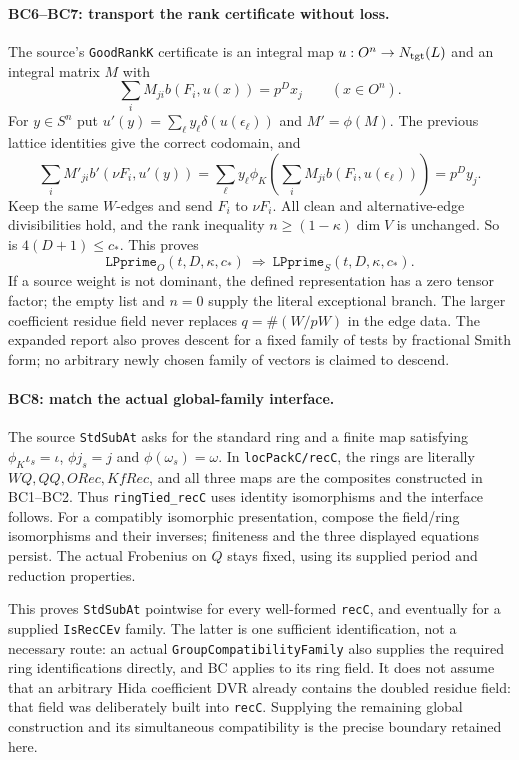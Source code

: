 \paragraph{BC6--BC7: transport the rank certificate without loss.}
The source's \texttt{GoodRankK} certificate is an integral map
$u:O^n\to N_{\rm tgt}(L)$ and an integral matrix $M$ with
\[
 \sum_i M_{ji}b(F_i,u(x))=p^Dx_j\qquad(x\in O^n).
\]
For $y\in S^n$ put $u'(y)=\sum_\ell y_\ell\delta(u(\epsilon_\ell))$
and $M'=\phi(M)$. The previous lattice identities give the correct
codomain, and
\[
 \sum_iM'_{ji}b'(\nu F_i,u'(y))
 =\sum_\ell y_\ell\phi_K\!\left(
         \sum_iM_{ji}b(F_i,u(\epsilon_\ell))\right)=p^Dy_j.
                                                               \tag{BC.11}
\]
Keep the same $W$-edges and send $F_i$ to $\nu F_i$. All clean
and alternative-edge divisibilities hold, and the rank inequality
$n\ge(1-\kappa)\dim V$ is unchanged. So is $4(D+1)\le c_*$.
This proves
\[
 \texttt{LPprime}_{O}(t,D,\kappa,c_*)
 \ \Longrightarrow\
 \texttt{LPprime}_{S}(t,D,\kappa,c_*).                    \tag{BC.12}
\]
If a source weight is not dominant, the defined representation has a
zero tensor factor; the empty list and $n=0$ supply the literal
exceptional branch. The larger coefficient residue field never replaces
$q=\#(W/pW)$ in the edge data. The expanded report also proves descent
for a fixed family of tests by fractional Smith form; no arbitrary newly
chosen family of vectors is claimed to descend.

\paragraph{BC8: match the actual global-family interface.}
The source \texttt{StdSubAt} asks for the standard ring and a finite map
satisfying $\phi_K\iota_s=\iota$, $\phi j_s=j$ and
$\phi(\omega_s)=\omega$. In \texttt{locPackC/recC}, the rings are
literally $WQ,QQ,ORec,KfRec$, and all three maps are the composites
constructed in BC1--BC2. Thus \texttt{ringTied\_recC} uses identity
isomorphisms and the interface follows. For a compatibly isomorphic
presentation, compose the field/ring isomorphisms and their inverses;
finiteness and the three displayed equations persist. The actual
Frobenius on $Q$ stays fixed, using its supplied period and reduction
properties.

This proves \texttt{StdSubAt} pointwise for every well-formed
\texttt{recC}, and eventually for a supplied \texttt{IsRecCEv} family.
The latter is one sufficient identification, not a necessary route:
an actual \texttt{GroupCompatibilityFamily} also supplies the required
ring identifications directly, and BC applies to its ring field.
It does not assume that an arbitrary Hida coefficient DVR already
contains the doubled residue field: that field was deliberately built
into \texttt{recC}. Supplying the remaining global construction and its
simultaneous compatibility is the precise boundary retained here.
